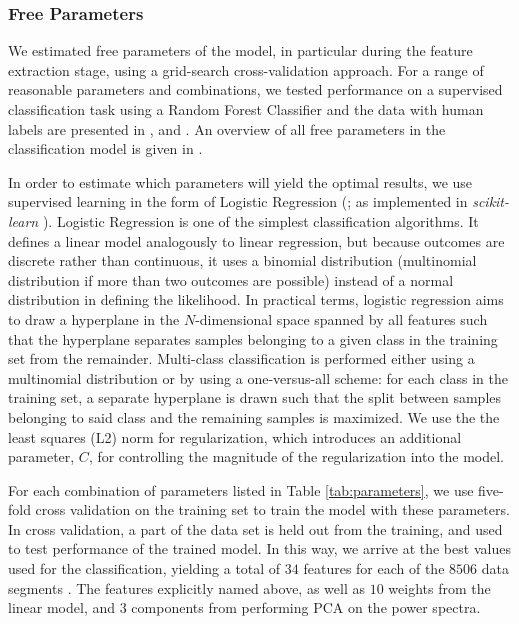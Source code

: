 \documentclass[12pt]{emulateapj}
\begin{document}
\subsubsection{Free Parameters}
\label{sec:freeparams}

We estimated free parameters of the model, in particular during the feature extraction stage, using a grid-search cross-validation approach. For a range of reasonable parameters and combinations, we tested performance on a supervised classification task using a Random Forest Classifier and the data with human labels are presented in \citet{belloni2000}, \citet{kleinwolt2002} and \citet{}. An overview of all free parameters in the classification model is given in .

In order to estimate which parameters will yield the optimal results, we use supervised learning in the form of Logistic Regression (\citealt{cox1958}; as implemented in \textit{scikit-learn} \citealt{scikit-learn}). Logistic Regression is one of the simplest classification algorithms. It defines a linear model analogously to linear regression, but because outcomes are discrete rather than continuous, it uses a binomial distribution (multinomial distribution if more than two outcomes are possible) instead of a normal distribution in defining the likelihood. In practical terms, logistic regression aims to draw a hyperplane in the $N$-dimensional space spanned by all features such that the hyperplane separates samples belonging to a given class in the training set from the remainder. Multi-class classification is performed either using a multinomial distribution or by using a one-versus-all scheme: for each class in the training set, a separate hyperplane is drawn such that the split between samples belonging to said class and the remaining samples is maximized. We use the the least squares (L2) norm for regularization, which introduces an additional parameter, $C$, for controlling the magnitude of the regularization into the  model. 

For each combination of parameters listed in Table \ref{tab:parameters}, we use five-fold cross validation on the training set to train the model with these parameters. In cross validation, a part of the data set is held out from the training, and used to test performance of the trained model. In this way, we arrive at the best
values used for the classification, yielding a total of $34$ features for each of the $8506$ data segments . The features explicitly named above, as well as $10$ weights from the linear model, and $3$ components from performing PCA on the power spectra.
\end{document}
